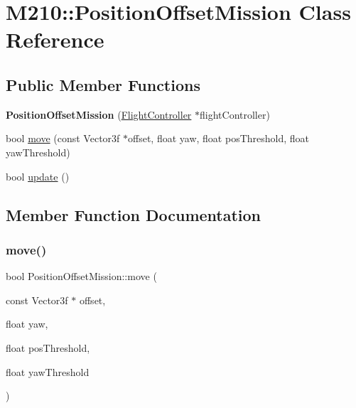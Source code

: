 \hypertarget{class_m210_1_1_position_offset_mission}{}\section{M210\+:\+:Position\+Offset\+Mission Class Reference}
\label{class_m210_1_1_position_offset_mission}
\subsection*{Public Member Functions}
\begin{DoxyCompactItemize}
\item 
\mbox{\label{class_m210_1_1_position_offset_mission_aca7a22775c3d9bd04f780b4754595304}} 
{\bfseries Position\+Offset\+Mission} (\mbox{\hyperlink{class_m210_1_1_flight_controller}{Flight\+Controller}} $\ast$flight\+Controller)
\item 
bool \mbox{\hyperlink{class_m210_1_1_position_offset_mission_a0927b9499ed266163a029679ff1723cb}{move}} (const Vector3f $\ast$offset, float yaw, float pos\+Threshold, float yaw\+Threshold)
\item 
bool \mbox{\hyperlink{class_m210_1_1_position_offset_mission_a73b8383335905c16a9a3b9298bbe2d75}{update}} ()
\end{DoxyCompactItemize}


\subsection{Member Function Documentation}
\mbox{\label{class_m210_1_1_position_offset_mission_a0927b9499ed266163a029679ff1723cb}} 
\subsubsection{\texorpdfstring{move()}{move()}}
{\footnotesize\ttfamily bool Position\+Offset\+Mission\+::move (\begin{DoxyParamCaption}\item[{const Vector3f $\ast$}]{offset,  }\item[{float}]{yaw,  }\item[{float}]{pos\+Threshold,  }\item[{float}]{yaw\+Threshold }\end{DoxyParamCaption})}

